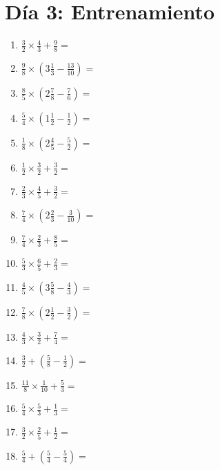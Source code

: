 \documentclass[12pt]{article}
\begin{document}
\section*{Día 3: Entrenamiento}
\begin{enumerate}[ itemsep=1.5cm]
	\item $\displaystyle \frac{3}{2} \times \frac{4}{3} + \frac{9}{8} =$
	\item $\displaystyle \frac{9}{8} \times \left( 3 \frac{1}{3} - \frac{13}{10} \right) =$
	\item $\displaystyle \frac{8}{5} \times \left( 2 \frac{7}{8} - \frac{7}{6} \right) =$
	\item $\displaystyle \frac{5}{4} \times \left( 1 \frac{1}{2} - \frac{1}{2} \right) =$
	\item $\displaystyle \frac{1}{8} \times \left( 2 \frac{4}{5} - \frac{5}{2} \right) =$
	\item $\displaystyle \frac{1}{2} \times \frac{3}{2} + \frac{3}{2} =$
	\item $\displaystyle \frac{2}{3} \times \frac{4}{5} + \frac{3}{2} =$
	\item $\displaystyle \frac{7}{4} \times \left( 2 \frac{2}{3} - \frac{3}{10} \right) =$
	\item $\displaystyle \frac{7}{4} \times \frac{2}{3} + \frac{8}{5} =$

	\item $\displaystyle \frac{5}{3} \times \frac{6}{5} + \frac{2}{3} =$
	\item $\displaystyle \frac{4}{5} \times \left( 3 \frac{5}{8} - \frac{4}{3} \right) =$
	\item $\displaystyle \frac{7}{8} \times \left( 2 \frac{1}{2} - \frac{3}{2} \right) =$
	\item $\displaystyle \frac{4}{3} \times \frac{3}{2} + \frac{7}{4} =$
	\item $\displaystyle \frac{3}{2} + \left( \frac{5}{8} - \frac{1}{2} \right) =$
	\item $\displaystyle \frac{11}{8} \times \frac{1}{10} + \frac{5}{3} =$
	\item $\displaystyle \frac{5}{4} \times \frac{5}{3} + \frac{1}{3} =$
	\item $\displaystyle \frac{3}{2} \times \frac{2}{5} + \frac{1}{2} =$
	\item $\displaystyle \frac{5}{4} + \left( \frac{5}{4} - \frac{5}{4} \right) =$


\end{enumerate}
\end{document}
